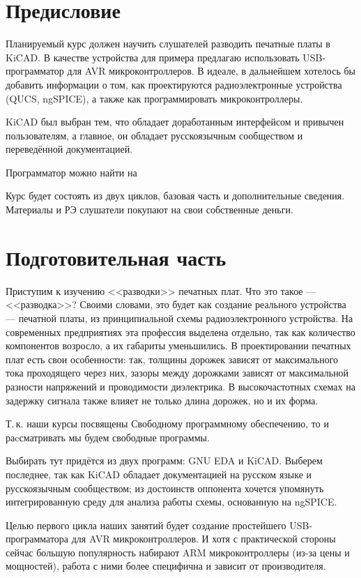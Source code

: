 \section{Предисловие}\label{kicad:introduction:pre}
Планируемый курс должен научить слушателей разводить печатные платы в KiCAD.
В качестве устройства для примера предлагаю использовать USB-программатор для AVR микроконтроллеров.
В идеале, в дальнейшем хотелось бы добавить информации о том, как проектируются радиоэлектронные устройства (QUCS, ngSPICE), а также как программировать микроконтроллеры.

KiCAD был выбран тем, что обладает доработанным интерфейсом и привычен пользователям, а главное, он обладает русскоязычным сообществом и переведённой документацией.

Программатор можно найти на 

Курс будет состоять из двух циклов, базовая часть и дополнительные сведения.
Материалы и РЭ слушатели покупают на свои собственные деньги. 

\section{Подготовительная часть} 
Приступим к изучению <<разводки>> печатных плат.
Что это такое --- <<разводка>>?
Своими словами, это будет как создание реального устройства --- печатной платы, из принципиальной схемы радиоэлектронного устройства. 
На современных предприятиях эта профессия выделена отдельно, так как количество компонентов возросло, а их габариты уменьшились.
В проектировании печатных плат есть свои особенности: так, толщины дорожек зависят от максимального тока проходящего через них, зазоры между дорожками зависят от максимальной разности напряжений и проводимости диэлектрика.
В высокочастотных схемах на задержку сигнала также влияет не только длина дорожек, но и их форма.

Т.\,к. наши курсы посвящены Свободному программному обеспечению, то и раcсматривать мы будем свободные программы.

Выбирать тут придётся из двух программ: GNU EDA и KiCAD.
Выберем последнее, так как KiCAD обладает документацией на русском языке и русскоязычным сообществом;
из достоинств оппонента хочется упомянуть интегрированную среду для анализа работы схемы, основанную на ngSPICE. 

Целью первого цикла наших занятий будет создание простейшего USB-программатора для AVR микроконтроллеров.
И хотя с практической стороны сейчас большую популярность набирают ARM микроконтроллеры (из-за цены и мощностей), работа с ними более специфична и зависит от производителя.

